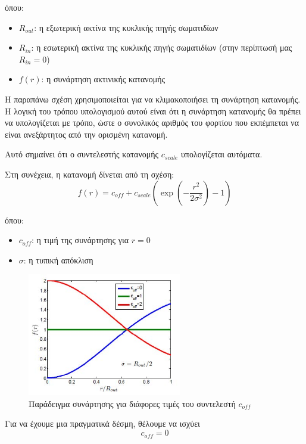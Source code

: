 όπου:
\begin{itemize}
\item $R_{out}$: η εξωτερική ακτίνα της κυκλικής πηγής σωματιδίων
\item $R_{in}$: η εσωτερική ακτίνα της κυκλικής πηγής σωματιδίων (στην περίπτωσή μας $R_{in} = 0$)
\item $f(r)$: η συνάρτηση ακτινικής κατανομής 
\end{itemize} 

Η παραπάνω σχέση χρησιμοποιείται για να κλιμακοποιήσει τη συνάρτηση κατανομής. 
Η λογική του τρόπου υπολογισμού αυτού είναι ότι η συνάρτηση κατανομής θα πρέπει να υπολογίζεται με τρόπο, ώστε ο συνολικός αριθμός του φορτίου που εκπέμπεται να είναι ανεξάρτητος από την ορισμένη κατανομή.

Αυτό σημαίνει ότι ο συντελεστής κατανομής $c_{scale}$ υπολογίζεται αυτόματα.

Στη συνέχεια, η  κατανομή δίνεται από τη σχέση:
\begin{equation}
f(r) = c_{off} + c_{scale} \left( \exp \left(-\frac{r^2}{2\sigma^2}\right) - 1 \right)
\end{equation}

όπου:
\begin{itemize}
\item $c_{off}$: η τιμή της συνάρτησης για $r = 0$
\item $\sigma$: η τυπική απόκλιση
\end{itemize} 

\begin{figure}[tph]
\includegraphics[width=0.6\textwidth]{figures/CST-gauss-function-for-coff}
\centering
\caption{Παράδειγμα  συνάρτησης για διάφορες τιμές του συντελεστή $c_{off}$}
\label{fig:CST-gauss-coff}
\end{figure}

Για να έχουμε μια πραγματικά  δέσμη, θέλουμε να ισχύει
\[c_{off} = 0\]

